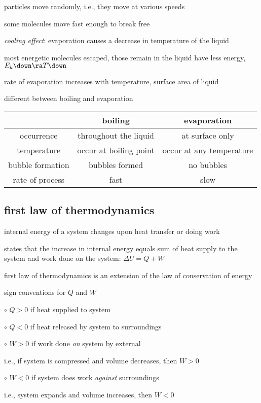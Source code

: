 particles move randomly, i.e., they move at various speeds

some molecules move fast enough to break free

\cmt \emph{cooling effect}: evaporation causes a decrease in temperature of the liquid

most energetic molecules escaped, those remain in the liquid have less energy, $E_k \down \ra T \down$

\cmt rate of evaporation increases with temperature, surface area of liquid

\cmt different between boiling and evaporation

\begin{center}
	\begin{tabular}{|c|c|c|}
		\hline 
		& boiling & evaporation \\ 
		\hline 
		occurrence & throughout the liquid & at surface only \\ 
		\hline 
		temperature & occur at boiling point & occur at any temperature \\ 
		\hline 
		bubble formation & bubbles formed & no bubbles \\ 
		\hline 
		rate of process & fast & slow \\ 
		\hline 
	\end{tabular} 
\end{center}

\subsection{first law of thermodynamics}

internal energy of a system changes upon heat transfer or doing work

\begin{ilight}
	 states that the increase in internal energy equals sum of heat supply to the system and work done on the system: $\boxed{\Delta U = Q +  W}$
\end{ilight}

\cmt first law of thermodynamics is an extension of the law of conservation of energy

\cmt sign conventions for $Q$ and $W$

\begin{compactitem}
	\item[$\circ$] $Q>0$ if heat supplied to system
	
	\item[$\circ$] $Q<0$ if heat released by system to surroundings
	
	\item[$\circ$] $W>0$ if work done \emph{on} system by external
	
	i.e., if system is compressed and volume decreases, then $W>0$
	
	\item[$\circ$] $W<0$ if system does work \emph{against} surroundings
	
	i.e., system expands and volume increases, then $W<0$
	
\end{compactitem}


